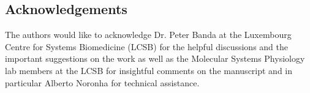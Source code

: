 \subsection*{Acknowledgements}
The authors would like to acknowledge Dr. Peter Banda at the Luxembourg Centre for Systems Biomedicine (LCSB) for the helpful discussions and the important suggestions on the work as well as the Molecular Systems Physiology lab members at the LCSB for insightful comments on the manuscript and in particular Alberto Noronha for technical assistance. 
